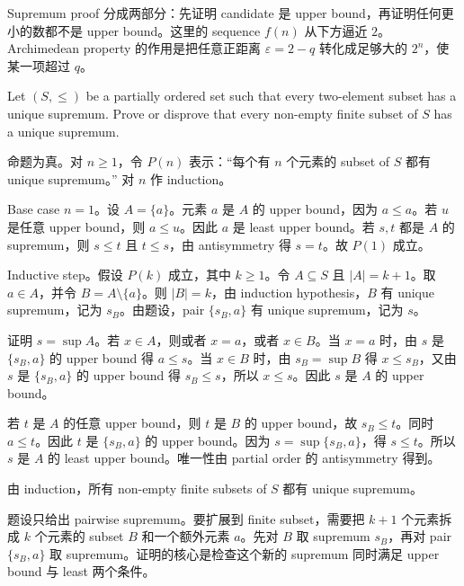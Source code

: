 \begin{explanation}
Supremum proof 分成两部分：先证明 candidate 是 upper bound，再证明任何更小的数都不是 upper bound。这里的 sequence \(f(n)\) 从下方逼近 \(2\)。Archimedean property 的作用是把任意正距离 \(\varepsilon=2-q\) 转化成足够大的 \(2^n\)，使某一项超过 \(q\)。
\end{explanation}

\begin{exerciseblock}
Let \((S,\le)\) be a partially ordered set such that every two-element subset has a unique supremum. Prove or disprove that every non-empty finite subset of \(S\) has a unique supremum.
\end{exerciseblock}

\begin{solution}
命题为真。对 \(n\ge1\)，令 \(P(n)\) 表示：“每个有 \(n\) 个元素的 subset of \(S\) 都有 unique supremum。” 对 \(n\) 作 induction。

Base case \(n=1\)。设 \(A=\{a\}\)。元素 \(a\) 是 \(A\) 的 upper bound，因为 \(a\le a\)。若 \(u\) 是任意 upper bound，则 \(a\le u\)。因此 \(a\) 是 least upper bound。若 \(s,t\) 都是 \(A\) 的 supremum，则 \(s\le t\) 且 \(t\le s\)，由 antisymmetry 得 \(s=t\)。故 \(P(1)\) 成立。

Inductive step。假设 \(P(k)\) 成立，其中 \(k\ge1\)。令 \(A\subseteq S\) 且 \(|A|=k+1\)。取 \(a\in A\)，并令 \(B=A\setminus\{a\}\)。则 \(|B|=k\)，由 induction hypothesis，\(B\) 有 unique supremum，记为 \(s_B\)。由题设，pair \(\{s_B,a\}\) 有 unique supremum，记为 \(s\)。

证明 \(s=\sup A\)。若 \(x\in A\)，则或者 \(x=a\)，或者 \(x\in B\)。当 \(x=a\) 时，由 \(s\) 是 \(\{s_B,a\}\) 的 upper bound 得 \(a\le s\)。当 \(x\in B\) 时，由 \(s_B=\sup B\) 得 \(x\le s_B\)，又由 \(s\) 是 \(\{s_B,a\}\) 的 upper bound 得 \(s_B\le s\)，所以 \(x\le s\)。因此 \(s\) 是 \(A\) 的 upper bound。

若 \(t\) 是 \(A\) 的任意 upper bound，则 \(t\) 是 \(B\) 的 upper bound，故 \(s_B\le t\)。同时 \(a\le t\)。因此 \(t\) 是 \(\{s_B,a\}\) 的 upper bound。因为 \(s=\sup\{s_B,a\}\)，得 \(s\le t\)。所以 \(s\) 是 \(A\) 的 least upper bound。唯一性由 partial order 的 antisymmetry 得到。

由 induction，所有 non-empty finite subsets of \(S\) 都有 unique supremum。
\end{solution}

\begin{explanation}
题设只给出 pairwise supremum。要扩展到 finite subset，需要把 \(k+1\) 个元素拆成 \(k\) 个元素的 subset \(B\) 和一个额外元素 \(a\)。先对 \(B\) 取 supremum \(s_B\)，再对 pair \(\{s_B,a\}\) 取 supremum。证明的核心是检查这个新的 supremum 同时满足 upper bound 与 least 两个条件。
\end{explanation}


